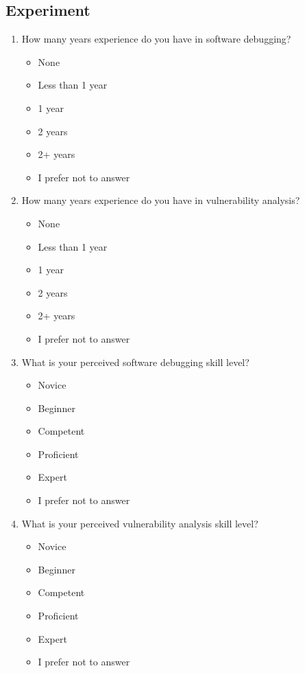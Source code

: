 \subsection{Experiment}
\begin{enumerate}
    \item How many years experience do you have in software debugging?
    \begin{itemize}
        \item None
        \item Less than 1 year
        \item 1 year
        \item 2 years
        \item 2+ years
        \item I prefer not to answer
    \end{itemize}
    \item How many years experience do you have in vulnerability analysis?
    \begin{itemize}
        \item None
        \item Less than 1 year
        \item 1 year
        \item 2 years
        \item 2+ years
        \item I prefer not to answer
    \end{itemize}
    \item What is your perceived software debugging skill level?
    \begin{itemize}
        \item Novice
        \item Beginner
        \item Competent
        \item Proficient
        \item Expert
        \item I prefer not to answer
    \end{itemize}
    \item What is your perceived vulnerability analysis skill level?
    \begin{itemize}
        \item Novice
        \item Beginner
        \item Competent
        \item Proficient
        \item Expert
        \item I prefer not to answer

\end{itemize}
\end{enumerate}
